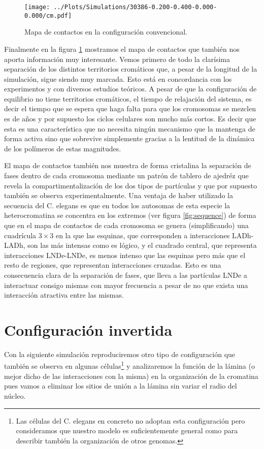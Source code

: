 \begin{figure}[t]
    \centering
    \texttt{[image: ../Plots/Simulations/30386-0.200-0.400-0.000-0.000/cm.pdf]}
    \caption{Mapa de contactos en la configuración convencional.}
    \label{fig:cm_c}
\end{figure}

Finalmente en la figura \ref{fig:cm_c} mostramos el mapa de contactos que también nos aporta información muy interesante. Vemos primero de todo la clarísima separación de los distintos territorios cromáticos que, a pesar de la longitud de la simulación, sigue siendo muy marcada. Esto está en concordancia con los experimentos y con diversos estudios teóricos. A pesar de que la configuración de equilibrio no tiene territorios cromáticos, el tiempo de relajación del sistema, es decir el tiempo que se espera que haga falta para que los cromosomas se mezclen es de años \cite{Rosa2008} y por supuesto los ciclos celulares son mucho más cortos. Es decir que esta es una característica que no necesita ningún mecanismo que la mantenga de forma activa sino que sobrevive simplemente gracias a la lentitud de la dinámica de los polímeros de estas magnitudes.

El mapa de contactos también nos muestra de forma cristalina la separación de fases dentro de cada cromosoma mediante un patrón de tablero de ajedréz que revela la compartimentalización de los dos tipos de partículas y que por supuesto también se observa experimentalmente. Una ventaja de haber utilizado la secuencia del C. elegans es que en todos los autosomas de esta especie la heterocromatina se concentra en los extremos (ver figura \ref{fig:sequence}) de forma que en el mapa de contactos de cada cromosoma se genera (simplificando) una cuadrícula $3\times3$ en la que las esquinas, que corresponden a interacciones LADh-LADh, son las más intensas como es lógico, y el cuadrado central, que representa interacciones LNDe-LNDe, es menos intenso que las esquinas pero más que el resto de regiones, que representan interacciones cruzadas. Esto es una consecuencia clara de la separación de fases, que lleva a las partículas LNDe a interactuar consigo mismas con mayor frecuencia a pesar de no que exista una interacción atractiva entre las mismas.

\section{Configuración invertida}

Con la siguiente simulación reproduciremos otro tipo de configuración que también se observa en algunas células\footnote{Las células del C. elegans en concreto no adoptan esta configuración pero consideramos que nuestro modelo es suficientemente general como para describir también la organización de otros genomas.} y analizaremos la función de la lámina (o mejor dicho de las interacciones con la misma) en la organización de la cromatina pues vamos a eliminar los sitios de unión a la lámina sin variar el radio del núcleo.

